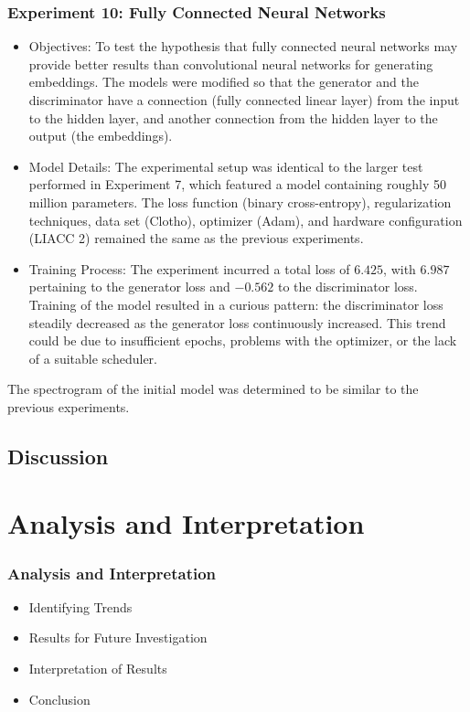 \begin{frame}
    \frametitle{Experiment 10: Fully Connected Neural Networks}

    \begin{itemize}
        \item Objectives: To test the hypothesis that fully connected neural networks may provide better results than convolutional neural networks for generating embeddings. The models were modified so that the generator and the discriminator have a connection (fully connected linear layer) from the input to the hidden layer, and another connection from the hidden layer to the output (the embeddings).
        \item Model Details: The experimental setup was identical to the larger test performed in Experiment 7, which featured a model containing roughly 50 million parameters. The loss function (binary cross-entropy), regularization techniques, data set (Clotho), optimizer (Adam), and hardware configuration (LIACC 2) remained the same as the previous experiments.
        \item Training Process: The experiment incurred a total loss of $6.425$, with $6.987$ pertaining to the generator loss and $-0.562$ to the discriminator loss. Training of the model resulted in a curious pattern: the discriminator loss steadily decreased as the generator loss continuously increased. This trend could be due to insufficient epochs, problems with the optimizer, or the lack of a suitable scheduler.
    \end{itemize}

    The spectrogram of the initial model was determined to be similar to the previous experiments.
\end{frame}


\subsection{Discussion}

\section{Analysis and Interpretation} \label{sec:res-analysis}

\begin{frame}
    \frametitle{Analysis and Interpretation}

    \begin{itemize}
        \item Identifying Trends
        \item Results for Future Investigation
        \item Interpretation of Results
        \item Conclusion
    \end{itemize}

\end{frame}

